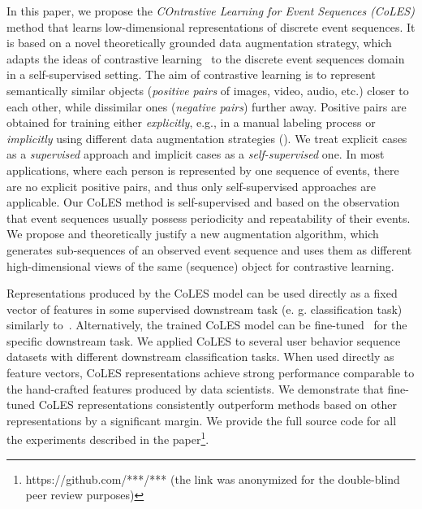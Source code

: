 \documentclass[sigconf]{acmart}
\begin{document}
In this paper, we propose the \emph{COntrastive Learning for Event Sequences (CoLES)} method that learns low-dimensional representations of discrete event sequences. It is based on a novel theoretically grounded data augmentation strategy, which adapts the ideas of contrastive learning~\citep{Xing2002DistanceML, Hadsell2006DimensionalityRB} to the discrete event sequences domain in a self-supervised setting.
The aim of contrastive learning is to represent semantically similar objects (\textit{positive pairs} of images, video, audio, etc.) closer to each other, while dissimilar ones (\textit{negative pairs}) further away. Positive pairs are obtained for training either {\it explicitly}, e.g., in a manual labeling process or {\it implicitly} using different data augmentation strategies (\cite{Falcon2020AFF}). We treat explicit cases as a {\it supervised} approach and implicit cases as a {\it self-supervised} one. In most applications, where each person is represented by one sequence of events, there are no explicit positive pairs, and thus only self-supervised approaches are applicable. Our CoLES method is self-supervised and based on the observation that event sequences usually possess periodicity and repeatability of their events. We propose and theoretically justify a new augmentation algorithm, which generates sub-sequences of an observed event sequence and uses them as different high-dimensional 
views of the same (sequence) object for contrastive learning.

Representations produced by the CoLES model can be used directly as a fixed vector of features in some supervised downstream task (e. g. classification task) similarly to~\citep{Mikolov2013EfficientEO, Song2017LearningUE, Zhai2019LearningAU}. Alternatively, the trained CoLES model can be fine-tuned~\citep{Devlin2019BERTPO} for the specific downstream task.
We applied CoLES to several user behavior sequence datasets with different downstream classification tasks. When used directly as feature vectors, CoLES representations achieve strong performance comparable to the hand-crafted features produced by data scientists.
We demonstrate that fine-tuned CoLES representations consistently outperform methods based on other representations by a significant margin. %
We provide the full source code for all the experiments described in the paper\footnote{https://github.com/***/*** (the link was anonymized for the double-blind peer review purposes)}.
\end{document}
